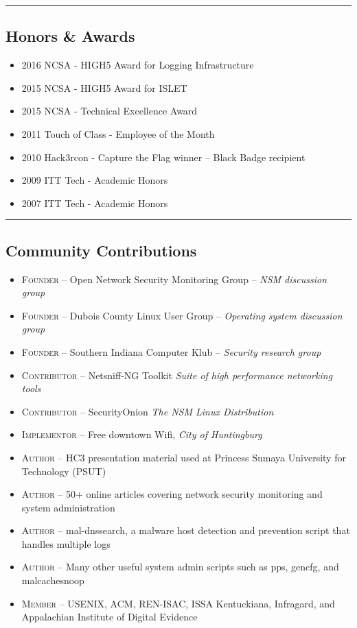 \documentclass[10pt,letterpaper]{article}
\begin{document}
\hrule
\vspace{-0.4em}
\subsection*{Honors \& Awards}

\begin{itemize}
	\parskip=0.1em

	\item \textsc{2016} NCSA - HIGH5 Award for Logging Infrastructure
	\item \textsc{2015} NCSA - HIGH5 Award for ISLET
	\item \textsc{2015} NCSA - Technical Excellence Award
	\item \textsc{2011} Touch of Class - Employee of the Month
	\item \textsc{2010} Hack3rcon - Capture the Flag winner – Black Badge recipient
	\item \textsc{2009} ITT Tech - Academic Honors
	\item \textsc{2007} ITT Tech - Academic Honors

\end{itemize}

\hrule
\vspace{-0.4em}
\subsection*{Community Contributions}

\begin{itemize}
	\parskip=0.1em

	\item \textsc{Founder} -- Open Network Security Monitoring Group – \textit{NSM discussion group}
	\item \textsc{Founder} -- Dubois County Linux User Group – \textit{Operating system discussion group}
	\item \textsc{Founder} -- Southern Indiana Computer Klub – \textit{Security research group}
	\item \textsc{Contributor} -- Netsniff-NG Toolkit \textit{Suite of high performance networking tools}
	\item \textsc{Contributor} -- SecurityOnion \textit{The NSM Linux Distribution}
	\item \textsc{Implementor} -- Free downtown Wifi, \textit{City of Huntingburg}
	\item \textsc{Author} -- HC3 presentation material used at Princess Sumaya University for Technology (PSUT)
	\item \textsc{Author} -- 50+ online articles covering network security monitoring and system administration
	\item \textsc{Author} -- mal-dnssearch, a malware host detection and prevention script that handles multiple logs
	\item \textsc{Author} -- Many other useful system admin scripts such as pps, gencfg, and malcachesnoop
	\item \textsc{Member} -- USENIX, ACM, REN-ISAC, ISSA Kentuckiana, Infragard, and Appalachian Institute of Digital Evidence

\end{itemize}
\end{document}
